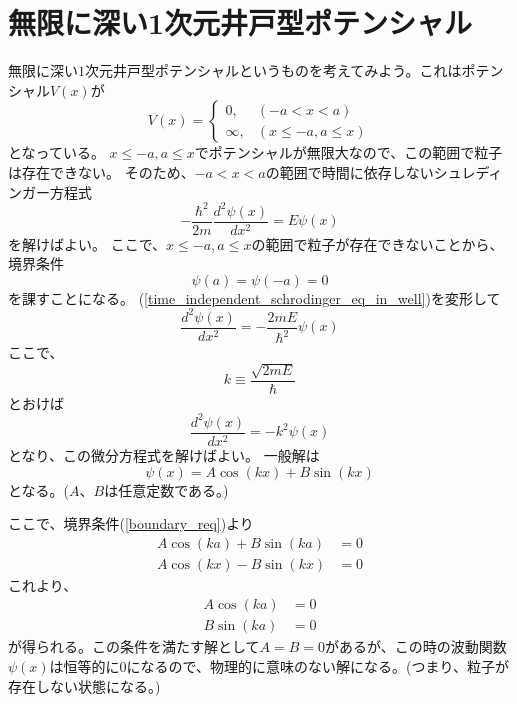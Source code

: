 
\section{無限に深い1次元井戸型ポテンシャル}
無限に深い$1$次元井戸型ポテンシャルというものを考えてみよう。これはポテンシャル$V(x)$が
\begin{equation}
  V(x) =
  \begin{cases}
    0,       & (-a < x < a) \\
    \infty , & (x \leq -a , a \leq x)
  \end{cases}
\end{equation}
となっている。
$x \leq -a , a \leq x$でポテンシャルが無限大なので、この範囲で粒子は存在できない。
そのため、$-a < x < a$の範囲で時間に依存しないシュレディンガー方程式
\begin{equation}
  \label{time_independent_schrodinger_eq_in_well}
  - \dfrac{\hbar^2}{2m} \dfrac{d^2 \psi(x)}{d x^2} = E\psi(x)
\end{equation}
を解けばよい。
ここで、$x \leq -a , a \leq x$の範囲で粒子が存在できないことから、
境界条件
\begin{equation}
  \label{boundary_req}
  \psi(a) = \psi(-a) = 0
\end{equation}
を課すことになる。
(\ref{time_independent_schrodinger_eq_in_well})を変形して
\begin{equation}
  \dfrac{d^2 \psi(x)}{d x^2} = -\dfrac{2mE}{\hbar^2}\psi(x)
\end{equation}
ここで、
\begin{equation}
  \label{k_equiv}
  k \equiv \dfrac{\sqrt{2mE}}{\hbar}
\end{equation}
とおけば
\begin{equation}
  \dfrac{d^2 \psi(x)}{d x^2} = -k^2\psi(x)
\end{equation}
となり、この微分方程式を解けばよい。
一般解は
\begin{equation}
  \psi(x) = A\cos(kx) + B\sin(kx)
\end{equation}
となる。($A$、$B$は任意定数である。)

ここで、境界条件(\ref{boundary_req})より
\begin{align}
  A\cos(ka) + B\sin(ka) &= 0 \\
  A\cos(kx) - B\sin(kx) &= 0
\end{align}
これより、
\begin{align}
  A\cos(ka) &= 0 \\
  B\sin(ka) &= 0
\end{align}
が得られる。この条件を満たす解として$A=B=0$があるが、この時の波動関数$\psi(x)$は恒等的に$0$になるので、物理的に意味のない解になる。(つまり、粒子が存在しない状態になる。)

